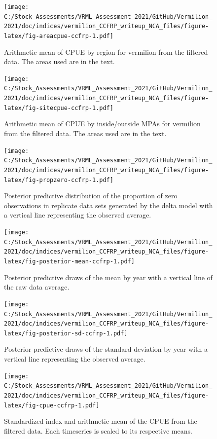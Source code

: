 \documentclass[11pt,
  english,
  a4paper,
]{article}
\begin{document}
\begin{figure}
\centering
\texttt{[image: C:/Stock\_Assessments/VRML\_Assessment\_2021/GitHub/Vermilion\_2021/doc/indices/vermilion\_CCFRP\_writeup\_NCA\_files/figure-latex/fig-areacpue-ccfrp-1.pdf]}
\caption{\label{fig:fig-areacpue-ccfrp}Arithmetic mean of CPUE by region for vermilion from the filtered data. The areas used are in the text.}
\end{figure}

\begin{figure}
\centering
\texttt{[image: C:/Stock\_Assessments/VRML\_Assessment\_2021/GitHub/Vermilion\_2021/doc/indices/vermilion\_CCFRP\_writeup\_NCA\_files/figure-latex/fig-sitecpue-ccfrp-1.pdf]}
\caption{\label{fig:fig-sitecpue-ccfrp}Arithmetic mean of CPUE by inside/outside MPAs for vermilion from the filtered data. The areas used are in the text.}
\end{figure}

\begin{figure}
\centering
\texttt{[image: C:/Stock\_Assessments/VRML\_Assessment\_2021/GitHub/Vermilion\_2021/doc/indices/vermilion\_CCFRP\_writeup\_NCA\_files/figure-latex/fig-propzero-ccfrp-1.pdf]}
\caption{\label{fig:fig-propzero-ccfrp}Posterior predictive distribution of the proportion of zero observations in replicate data sets generated by the delta model with a vertical line representing the observed average.}
\end{figure}

\begin{figure}
\centering
\texttt{[image: C:/Stock\_Assessments/VRML\_Assessment\_2021/GitHub/Vermilion\_2021/doc/indices/vermilion\_CCFRP\_writeup\_NCA\_files/figure-latex/fig-posterior-mean-ccfrp-1.pdf]}
\caption{\label{fig:fig-posterior-mean-ccfrp}Posterior predictive draws of the mean by year with a vertical line of the raw data average.}
\end{figure}

\begin{figure}
\centering
\texttt{[image: C:/Stock\_Assessments/VRML\_Assessment\_2021/GitHub/Vermilion\_2021/doc/indices/vermilion\_CCFRP\_writeup\_NCA\_files/figure-latex/fig-posterior-sd-ccfrp-1.pdf]}
\caption{\label{fig:fig-posterior-sd-ccfrp}Posterior predictive draws of the standard deviation by year with a vertical line representing the observed average.}
\end{figure}

\begin{figure}
\centering
\texttt{[image: C:/Stock\_Assessments/VRML\_Assessment\_2021/GitHub/Vermilion\_2021/doc/indices/vermilion\_CCFRP\_writeup\_NCA\_files/figure-latex/fig-cpue-ccfrp-1.pdf]}
\caption{\label{fig:fig-cpue-ccfrp}Standardized index and arithmetic mean of the CPUE from the filtered data. Each timeseries is scaled to its respective means.}
\end{figure}
\end{document}
